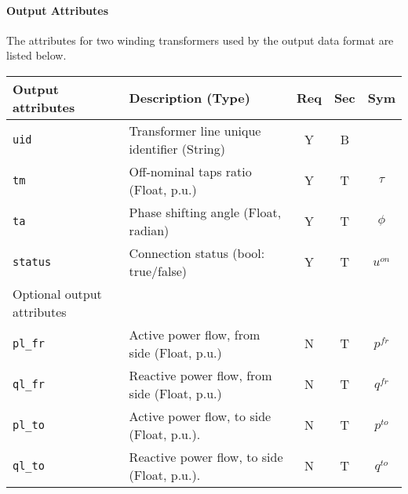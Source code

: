 \documentclass{article}
\begin{document}



\paragraph{Output Attributes}
The attributes for two winding transformers used by the output data format are listed below.
\begin{center}
\small
\begin{tabular}{ l | l | c | c | c |}
Output attributes & Description (Type)& Req & Sec & Sym\\
\hline
 {\tt uid} & Transformer line unique identifier (String)& Y & B & \\
 {\tt tm} & Off-nominal taps ratio (Float, p.u.)& Y & T & $\tau$\\
 {\tt ta} & Phase shifting angle (Float, radian)& Y & T & $\phi$\\
 {\tt status}     & Connection status (bool: true/false) & Y & T & $u^{on}$ \\
\hline
  Optional output attributes &   &  & & \\
\hline
 {\tt pl\_fr} & Active power flow, from side (Float, p.u.)  & N & T & $p^{fr}$ \\
 {\tt ql\_fr} & Reactive power flow, from side (Float, p.u.)& N & T & $q^{fr}$ \\
 {\tt pl\_to} & Active power flow, to side (Float, p.u.).   & N & T & $p^{to}$ \\
 {\tt ql\_to} & Reactive power flow, to side (Float, p.u.). & N & T & $q^{to}$ \\
\hline
\end{tabular}
\end{center}
\end{document}
